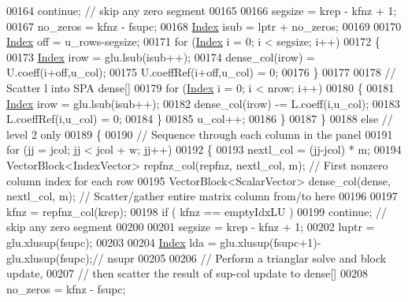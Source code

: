 \begin{DoxyCode}
00164           \textcolor{keywordflow}{continue}; \textcolor{comment}{// skip any zero segment}
00165         
00166         segsize = krep - kfnz + 1;
00167         no\_zeros = kfnz - fsupc; 
00168         \hyperlink{namespace_eigen_a62e77e0933482dafde8fe197d9a2cfde}{Index} isub = lptr + no\_zeros;
00169         
00170         \hyperlink{namespace_eigen_a62e77e0933482dafde8fe197d9a2cfde}{Index} off = u\_rows-segsize;
00171         \textcolor{keywordflow}{for} (\hyperlink{namespace_eigen_a62e77e0933482dafde8fe197d9a2cfde}{Index} i = 0; i < segsize; i++)
00172         \{
00173           \hyperlink{namespace_eigen_a62e77e0933482dafde8fe197d9a2cfde}{Index} irow = glu.lsub(isub++); 
00174           dense\_col(irow) = U.coeff(i+off,u\_col);
00175           U.coeffRef(i+off,u\_col) = 0;
00176         \}
00177         
00178         \textcolor{comment}{// Scatter l into SPA dense[]}
00179         \textcolor{keywordflow}{for} (\hyperlink{namespace_eigen_a62e77e0933482dafde8fe197d9a2cfde}{Index} i = 0; i < nrow; i++)
00180         \{
00181           \hyperlink{namespace_eigen_a62e77e0933482dafde8fe197d9a2cfde}{Index} irow = glu.lsub(isub++); 
00182           dense\_col(irow) -= L.coeff(i,u\_col);
00183           L.coeffRef(i,u\_col) = 0;
00184         \}
00185         u\_col++;
00186       \}
00187     \}
00188     \textcolor{keywordflow}{else} \textcolor{comment}{// level 2 only}
00189     \{
00190       \textcolor{comment}{// Sequence through each column in the panel}
00191       \textcolor{keywordflow}{for} (jj = jcol; jj < jcol + w; jj++)
00192       \{
00193         nextl\_col = (jj-jcol) * m; 
00194         VectorBlock<IndexVector> repfnz\_col(repfnz, nextl\_col, m); \textcolor{comment}{// First nonzero column index for each
       row}
00195         VectorBlock<ScalarVector> dense\_col(dense, nextl\_col, m); \textcolor{comment}{// Scatter/gather entire matrix column
       from/to here}
00196         
00197         kfnz = repfnz\_col(krep); 
00198         \textcolor{keywordflow}{if} ( kfnz == emptyIdxLU ) 
00199           \textcolor{keywordflow}{continue}; \textcolor{comment}{// skip any zero segment}
00200         
00201         segsize = krep - kfnz + 1;
00202         luptr = glu.xlusup(fsupc);
00203         
00204         \hyperlink{namespace_eigen_a62e77e0933482dafde8fe197d9a2cfde}{Index} lda = glu.xlusup(fsupc+1)-glu.xlusup(fsupc);\textcolor{comment}{// nsupr}
00205         
00206         \textcolor{comment}{// Perform a trianglar solve and block update, }
00207         \textcolor{comment}{// then scatter the result of sup-col update to dense[]}
00208         no\_zeros = kfnz - fsupc; 

\end{DoxyCode}
